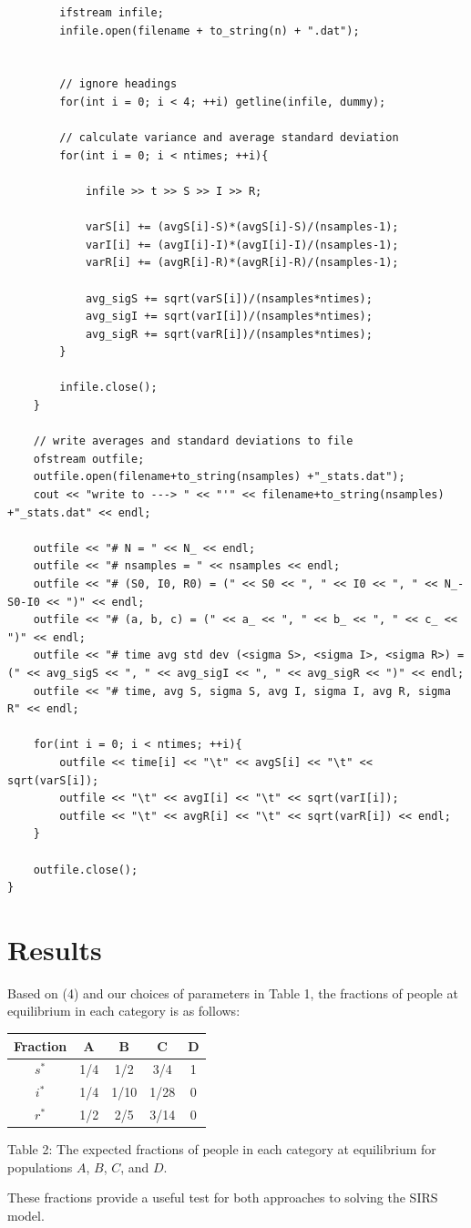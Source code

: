 \documentclass[prb,aps,twocolumn,showpacs,10pt]{revtex4-1}
\begin{document}
\begin{lstlisting}
		ifstream infile;
		infile.open(filename + to_string(n) + ".dat");


		// ignore headings
		for(int i = 0; i < 4; ++i) getline(infile, dummy);

		// calculate variance and average standard deviation
		for(int i = 0; i < ntimes; ++i){

			infile >> t >> S >> I >> R;

			varS[i] += (avgS[i]-S)*(avgS[i]-S)/(nsamples-1);
			varI[i] += (avgI[i]-I)*(avgI[i]-I)/(nsamples-1);
			varR[i] += (avgR[i]-R)*(avgR[i]-R)/(nsamples-1);

			avg_sigS += sqrt(varS[i])/(nsamples*ntimes);
			avg_sigI += sqrt(varI[i])/(nsamples*ntimes);
			avg_sigR += sqrt(varR[i])/(nsamples*ntimes);
		}

		infile.close();
	}

	// write averages and standard deviations to file
	ofstream outfile;
	outfile.open(filename+to_string(nsamples) +"_stats.dat");
	cout << "write to ---> " << "'" << filename+to_string(nsamples) +"_stats.dat" << endl;

	outfile << "# N = " << N_ << endl;
	outfile << "# nsamples = " << nsamples << endl;
	outfile << "# (S0, I0, R0) = (" << S0 << ", " << I0 << ", " << N_-S0-I0 << ")" << endl;
	outfile << "# (a, b, c) = (" << a_ << ", " << b_ << ", " << c_ << ")" << endl;
	outfile << "# time avg std dev (<sigma S>, <sigma I>, <sigma R>) = (" << avg_sigS << ", " << avg_sigI << ", " << avg_sigR << ")" << endl;
	outfile << "# time, avg S, sigma S, avg I, sigma I, avg R, sigma R" << endl;

	for(int i = 0; i < ntimes; ++i){
		outfile << time[i] << "\t" << avgS[i] << "\t" << sqrt(varS[i]);
		outfile << "\t" << avgI[i] << "\t" << sqrt(varI[i]);
		outfile << "\t" << avgR[i] << "\t" << sqrt(varR[i]) << endl;
	}

	outfile.close();
}
\end{lstlisting}

\section{Results}

Based on (4) and our choices of parameters in Table 1, the fractions of people at equilibrium in each category is as follows:
\begin{center}
\begin{tabular}{|c|c|c|c|c|}
\hline
\textbf{Fraction}&\textbf{A}&\textbf{B}&\textbf{C}&\textbf{D}\\
\hline
\hline
$s^*$&1/4&1/2&3/4&1\\
\hline
$i^*$&1/4&1/10&1/28&0\\
\hline
$r^*$&1/2&2/5&3/14&0\\
\hline
\end{tabular}
\vspace*{5mm}

Table 2: The expected fractions of people in each category at equilibrium for populations $A$, $B$, $C$, and $D$.
\end{center}
\vspace*{5mm}
These fractions provide a useful test for both approaches to solving the SIRS model.
\end{document}
